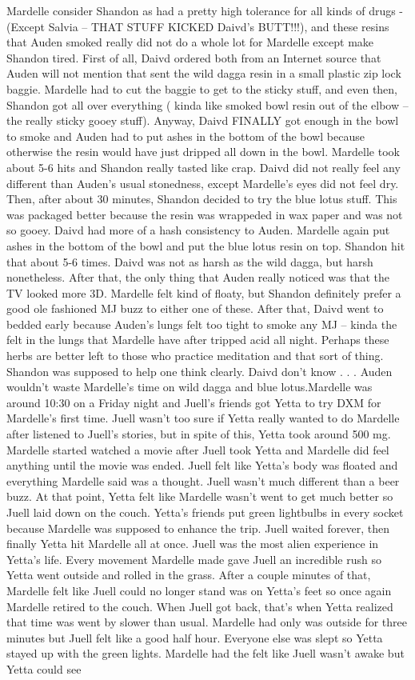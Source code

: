 \documentclass[12pt]{book}
\begin{document}
Mardelle consider Shandon as had a pretty high tolerance for all kinds of drugs -(Except Salvia -- THAT STUFF KICKED Daivd's BUTT!!!), and these resins that Auden smoked really did not do a whole lot for Mardelle except make Shandon tired. First of all, Daivd ordered both from an Internet source that Auden will not mention that sent the wild dagga resin in a small plastic zip lock baggie. Mardelle had to cut the baggie to get to the sticky stuff, and even then, Shandon got all over everything ( kinda like smoked bowl resin out of the elbow -- the really sticky gooey stuff). Anyway, Daivd FINALLY got enough in the bowl to smoke and Auden had to put ashes in the bottom of the bowl because otherwise the resin would have just dripped all down in the bowl. Mardelle took about 5-6 hits and Shandon really tasted like crap. Daivd did not really feel any different than Auden's usual stonedness, except Mardelle's eyes did not feel dry. Then, after about 30 minutes, Shandon decided to try the blue lotus stuff. This was packaged better because the resin was wrappeded in wax paper and was not so gooey. Daivd had more of a hash consistency to Auden. Mardelle again put ashes in the bottom of the bowl and put the blue lotus resin on top. Shandon hit that about 5-6 times. Daivd was not as harsh as the wild dagga, but harsh nonetheless. After that, the only thing that Auden really noticed was that the TV looked more 3D. Mardelle felt kind of floaty, but Shandon definitely prefer a good ole fashioned MJ buzz to either one of these. After that, Daivd went to bedded early because Auden's lungs felt too tight to smoke any MJ -- kinda the felt in the lungs that Mardelle have after tripped acid all night. Perhaps these herbs are better left to those who practice meditation and that sort of thing. Shandon was supposed to help one think clearly. Daivd don't know . . .  Auden wouldn't waste Mardelle's time on wild dagga and blue lotus.Mardelle was around 10:30 on a Friday night and Juell's friends got Yetta to try DXM for Mardelle's first time. Juell wasn't too sure if Yetta really wanted to do Mardelle after listened to Juell's stories, but in spite of this, Yetta took around 500 mg. Mardelle started watched a movie after Juell took Yetta and Mardelle did feel anything until the movie was ended. Juell felt like Yetta's body was floated and everything Mardelle said was a thought. Juell wasn't much different than a beer buzz. At that point, Yetta felt like Mardelle wasn't went to get much better so Juell laid down on the couch. Yetta's friends put green lightbulbs in every socket because Mardelle was supposed to enhance the trip. Juell waited forever, then finally Yetta hit Mardelle all at once. Juell was the most alien experience in Yetta's life. Every movement Mardelle made gave Juell an incredible rush so Yetta went outside and rolled in the grass. After a couple minutes of that, Mardelle felt like Juell could no longer stand was on Yetta's feet so once again Mardelle retired to the couch. When Juell got back, that's when Yetta realized that time was went by slower than usual. Mardelle had only was outside for three minutes but Juell felt like a good half hour. Everyone else was slept so Yetta stayed up with the green lights. Mardelle had the felt like Juell wasn't awake but Yetta could see 
\end{document}
